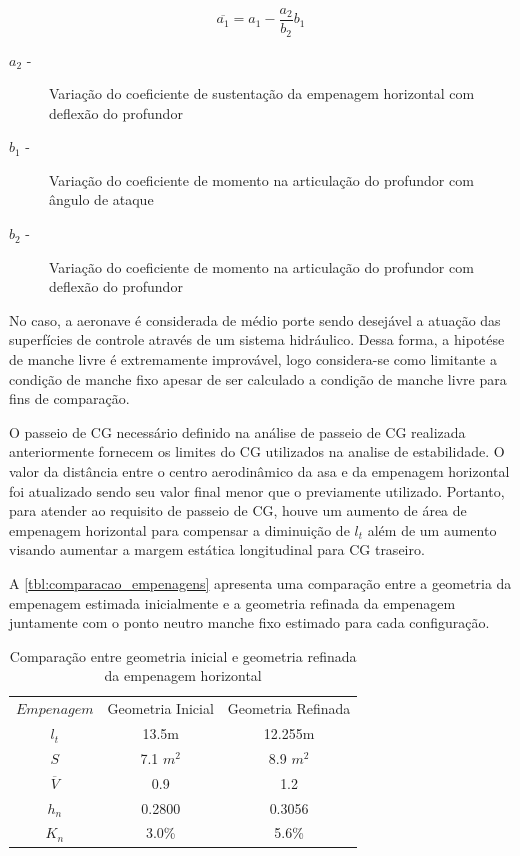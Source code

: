 \begin{equation}
\overline{a_1} =  a_1 - \frac{a_2}{b_2} b_1
\end{equation}

\begin{description}
\item[$a_2$ -] Variação do coeficiente de sustentação da empenagem horizontal com deflexão do profundor
\item[$b_1$ -] Variação do coeficiente de momento na articulação do profundor com ângulo de ataque
\item[$b_2$ -] Variação do coeficiente de momento na articulação do profundor com deflexão do profundor
\end{description}

No caso, a aeronave é considerada de médio porte sendo desejável a atuação das superfícies de controle através de um sistema hidráulico. Dessa forma, a hipotése de manche livre é extremamente improvável, logo considera-se como limitante a condição de manche fixo apesar de ser calculado a condição de manche livre para fins de comparação.

O passeio de CG necessário definido na análise de passeio de CG realizada anteriormente fornecem os limites do CG utilizados na analise de estabilidade. O valor da distância entre o centro aerodinâmico da asa e da empenagem horizontal foi atualizado sendo seu valor final menor que o previamente utilizado. Portanto, para atender ao requisito de passeio de CG, houve um aumento de área de empenagem horizontal para compensar a diminuição de $l_t$ além de um aumento visando aumentar a margem estática longitudinal para CG traseiro.

A \autoref{tbl:comparacao_empenagens} apresenta uma comparação entre a geometria da empenagem estimada inicialmente e a geometria refinada da empenagem juntamente com o ponto neutro manche fixo estimado para cada configuração.

\begin{table}[H]
\centering
\begin{tabular}{ccc}
\toprule
$ Empenagem $ & Geometria Inicial & Geometria Refinada \\
$ l_t $ & 13.5m & 12.255m \\
$ S $ & 7.1 $m^2$ & 8.9 $m^2$ \\
$ \overline{V} $ & 0.9 & 1.2 \\
$ h_n $ & 0.2800 & 0.3056 \\
$ K_n $ & 3.0\% & 5.6\% \\
\bottomrule
\end{tabular}
\caption[Comparação entre geometria inicial e geometria refinada da empenagem horizontal]{Comparação entre geometria inicial e geometria refinada da empenagem horizontal}
\label{tbl:comparacao_empenagens}
\end{table}

